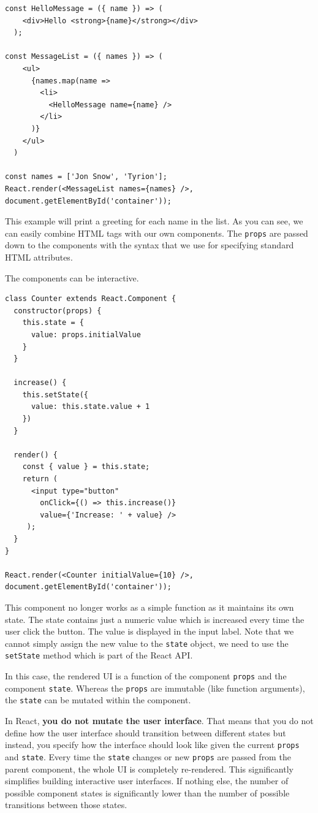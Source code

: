 \begin{verbatim}
const HelloMessage = ({ name }) => (
    <div>Hello <strong>{name}</strong></div>
  );
  
const MessageList = ({ names }) => (
    <ul>
      {names.map(name => 
        <li>
          <HelloMessage name={name} />
        </li>
      )}
    </ul>
  )

const names = ['Jon Snow', 'Tyrion'];
React.render(<MessageList names={names} />, document.getElementById('container'));
\end{verbatim}

This example will print a greeting for each name in the list. As you can see, we can easily combine HTML tags with our own components. The \texttt{props} are passed down to the components with the syntax that we use for specifying  standard HTML attributes.

The components can be interactive.

\begin{verbatim}
class Counter extends React.Component {
  constructor(props) {
    this.state = {
      value: props.initialValue
    }
  }
  
  increase() {
    this.setState({
      value: this.state.value + 1
    })
  }
  
  render() {
    const { value } = this.state;
    return (
      <input type="button" 
        onClick={() => this.increase()} 
        value={'Increase: ' + value} />
     );
  }
} 

React.render(<Counter initialValue={10} />, document.getElementById('container'));
\end{verbatim}

This component no longer works as a simple function as it maintains its own state. The state contains just a numeric value which is increased every time the user click the button. The value is displayed in the input label. Note that we cannot simply assign the new value to the \texttt{state} object, we need to use the \texttt{setState} method which is part of the React API.

In this case, the rendered UI is a function of the component \texttt{props} and the component \texttt{state}. Whereas the \texttt{props} are immutable (like function arguments), the \texttt{state} can be mutated within the component.

In React, \textbf{you do not mutate the user interface}. That means that you do not define how the user interface should transition between different states but instead, you specify how the interface should look like given the current \texttt{props} and \texttt{state}. Every time the \texttt{state} changes or new \texttt{props} are passed from the parent component, the whole UI is completely re-rendered. This significantly simplifies building interactive user interfaces. If nothing else, the number of possible component states is significantly lower than the number of possible transitions between those states.

